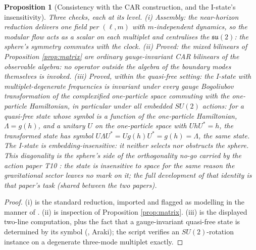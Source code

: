 \documentclass[11pt]{article}
\newtheorem{proposition}[theorem]{Proposition}
\theoremstyle{definition}
\begin{document}
\begin{proposition}[Consistency with the CAR construction, and the I-state's insensitivity]\label{prop:consistency}
Three checks, each at its level. (i) \emph{Assembly:} the near-horizon reduction delivers one field per $(\ell, m)$ with $m$-independent dynamics, so the modular flow acts as a scalar on each multiplet and centralises the $\mathfrak{su}(2)$: the sphere's symmetry commutes with the clock. (ii) \emph{Proved:} the mixed bilinears of Proposition \ref{prop:matrix} are ordinary gauge-invariant CAR bilinears of the observable algebra: no operator outside the algebra of the boundary modes themselves is invoked. (iii) \emph{Proved, within the quasi-free setting:} the I-state with multiplet-degenerate frequencies is invariant under every gauge Bogoliubov transformation of the complexified one-particle space commuting with the one-particle Hamiltonian, in particular under all embedded $SU(2)$ actions: for a quasi-free state whose symbol is a function of the one-particle Hamiltonian, $\Lambda = g(h)$, and a unitary $U$ on the one-particle space with $UhU^* = h$, the transformed state has symbol $U\Lambda U^* = Ug(h)U^* = g(h) = \Lambda$, the same state. The I-state is embedding-insensitive: it neither selects nor obstructs the sphere. This diagonality is the sphere's side of the orthogonality no-go carried by the action paper T10 \cite{ButlerT10}: the state is insensitive to space for the same reason the gravitational sector leaves no mark on it; the full development of that identity is that paper's task (shared between the two papers).
\end{proposition}

\begin{proof}
(i) is the standard reduction, imported and flagged as modelling in the manner of \cite[Rem.~4.5]{ButlerT7}. (ii) is inspection of Proposition \ref{prop:matrix}. (iii) is the displayed two-line computation, plus the fact that a gauge-invariant quasi-free state is determined by its symbol (\cite[Fact 3.3]{ButlerT7}, Araki); the script verifies an $SU(2)$-rotation instance on a degenerate three-mode multiplet exactly.
\end{proof}
\end{document}
